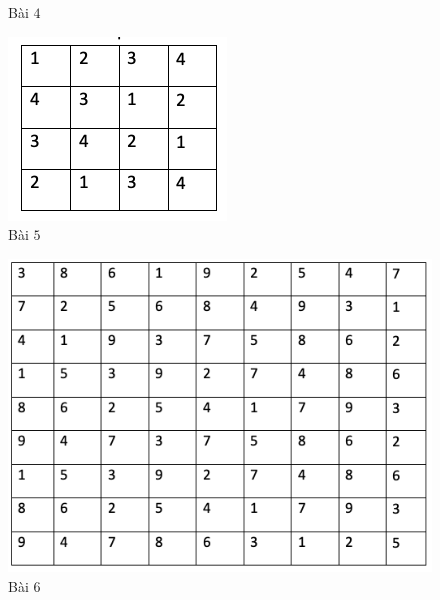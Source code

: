 \begin{multicols}{2}
\begin{figure}[H]
		\caption{\small{Bài $4$}}
		\vspace*{-10pt}
	\end{figure}
	\begin{figure}[H]
		\centering
		\vspace*{-5pt}
		\captionsetup{labelformat= empty, justification=centering}
		\includegraphics[width=0.9\linewidth]{sudoku5}
		\caption{\small{Bài $5$}}
		\vspace*{-10pt}
	\end{figure}
	\begin{figure}[H]
		\centering
		\vspace*{-5pt}
		\captionsetup{labelformat= empty, justification=centering}
		\includegraphics[width=0.9\linewidth]{sudoku6}
		\caption{\small{Bài $6$}}
		\vspace*{-10pt}
	\end{figure}
\end{multicols}
